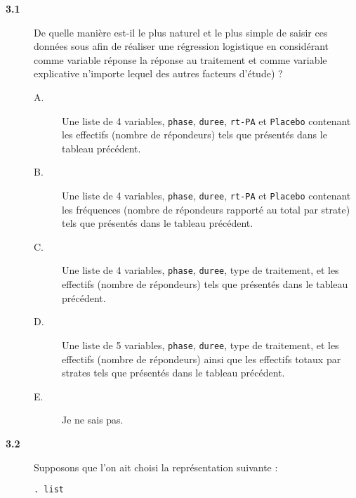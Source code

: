 \begin{description}
\item[\bf 3.1] De quelle manière est-il le plus naturel et le plus simple de
  saisir ces données sous \Stata afin de réaliser une régression logistique
  en considérant comme variable réponse la réponse au traitement et comme
  variable explicative n'importe lequel des autres facteurs d'étude) ?
\begin{description}
\item[A.] Une liste de 4 variables, \texttt{phase}, \texttt{duree},
  \texttt{rt-PA} et \texttt{Placebo} contenant les effectifs (nombre de
  répondeurs) tels que présentés dans le tableau précédent.
\item[B.] Une liste de 4 variables, \texttt{phase}, \texttt{duree},
  \texttt{rt-PA} et \texttt{Placebo} contenant les fréquences (nombre de
  répondeurs rapporté au total par strate) tels que présentés dans le
  tableau précédent. 
\item[C.] Une liste de 4 variables, \texttt{phase}, \texttt{duree}, type
  de traitement, et les effectifs (nombre de répondeurs) tels que
  présentés dans le tableau précédent.
\item[D.] Une liste de 5 variables, \texttt{phase}, \texttt{duree}, type
  de traitement, et les effectifs (nombre de répondeurs) ainsi que les
  effectifs totaux par strates tels que présentés dans le tableau précédent.
\item[E.] Je ne sais pas.
\end{description}
\item[\bf 3.2] Supposons que l'on ait choisi la représentation suivante :
\begin{verbatim}
. list


\end{verbatim}
\end{description}
